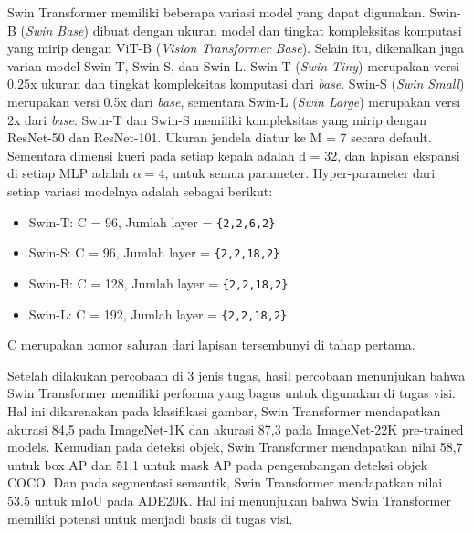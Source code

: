 Swin Transformer memiliki beberapa variasi model yang dapat digunakan. Swin-B (\emph{Swin Base}) dibuat dengan ukuran model dan tingkat kompleksitas komputasi yang mirip dengan ViT-B 
(\emph{Vision Transformer Base}). Selain itu, dikenalkan juga varian model Swin-T, Swin-S, dan Swin-L. Swin-T (\emph{Swin Tiny}) merupakan versi 0.25x ukuran dan tingkat kompleksitas 
komputasi dari \emph{base}. Swin-S (\emph{Swin Small}) merupakan versi 0.5x dari \emph{base}, sementara Swin-L (\emph{Swin Large}) merupakan versi 2x dari \emph{base}. Swin-T dan Swin-S 
memiliki kompleksitas yang mirip dengan ResNet-50 dan ResNet-101. Ukuran jendela diatur ke M = 7 secara default. Sementara dimensi kueri pada setiap kepala adalah d = 32, dan lapisan 
ekspansi di setiap MLP adalah \begin{math}\alpha = 4\end{math}, untuk semua parameter. Hyper-parameter dari setiap variasi modelnya adalah sebagai berikut:

\begin{itemize}[nolistsep]

  \item Swin-T: C = 96, Jumlah layer = \verb|{2,2,6,2}|

  \item Swin-S: C = 96, Jumlah layer = \verb|{2,2,18,2}|

  \item Swin-B: C = 128, Jumlah layer = \verb|{2,2,18,2}|

  \item Swin-L: C = 192, Jumlah layer = \verb|{2,2,18,2}|

\end{itemize}

C merupakan nomor saluran dari lapisan tersembunyi di tahap pertama.\parencite{Liu2021}

Setelah dilakukan percobaan di 3 jenis tugas, hasil percobaan menunjukan bahwa Swin Transformer memiliki performa yang bagus untuk digunakan di tugas visi. Hal ini dikarenakan pada klasifikasi gambar, Swin 
Transformer mendapatkan akurasi 84,5 pada ImageNet-1K dan akurasi 87,3 pada ImageNet-22K pre-trained models. Kemudian pada deteksi objek, Swin Transformer mendapatkan nilai 58,7 untuk box AP dan 51,1 
untuk mask AP pada pengembangan deteksi objek COCO. Dan pada segmentasi semantik, Swin Transformer mendapatkan nilai 53.5 untuk mIoU pada ADE20K. Hal ini menunjukan bahwa Swin Transformer memiliki potensi 
untuk menjadi basis di tugas visi.\parencite{Liu2021}

